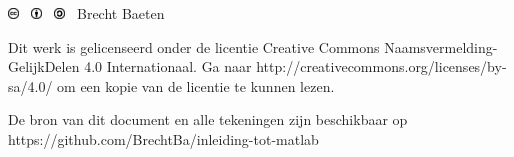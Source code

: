\documentclass[t]{beamer}
\begin{document}
\begin{frame}
	\footnotesize
	\vspace{4cm}
	\includegraphics[height=0.3cm]{fig/cc} \
	\includegraphics[height=0.3cm]{fig/by} \
	\includegraphics[height=0.3cm]{fig/sa}
	\quad \the\year\ Brecht Baeten
	\vspace{0.5cm}
	
    Dit werk is gelicenseerd onder de licentie Creative Commons Naamsvermelding-GelijkDelen 4.0 Internationaal. Ga naar http://creativecommons.org/licenses/by-sa/4.0/ om een kopie van de licentie te kunnen lezen.
    	
    \vspace{0.5cm}
    De bron van dit document en alle tekeningen zijn beschikbaar op https://github.com/BrechtBa/inleiding-tot-matlab
\end{frame}
\end{document}
